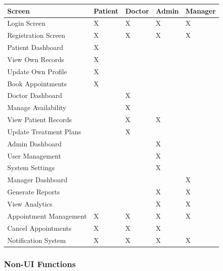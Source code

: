 \documentclass[12pt,a4paper]{article}
\begin{document}
\begin{longtable}{|p{4cm}|p{2cm}|p{2cm}|p{2cm}|p{2cm}|}
\hline
\textbf{Screen} & \textbf{Patient} & \textbf{Doctor} & \textbf{Admin} & \textbf{Manager} \\
\hline
Login Screen & X & X & X & X \\
\hline
Registration Screen & X & X & X & X \\
\hline
Patient Dashboard & X & & & \\
\hline
\quad View Own Records & X & & & \\
\hline
\quad Update Own Profile & X & & & \\
\hline
\quad Book Appointments & X & & & \\
\hline
Doctor Dashboard & & X & & \\
\hline
\quad Manage Availability & & X & & \\
\hline
\quad View Patient Records & & X & X & \\
\hline
\quad Update Treatment Plans & & X & & \\
\hline
Admin Dashboard & & & X & \\
\hline
\quad User Management & & & X & \\
\hline
\quad System Settings & & & X & \\
\hline
Manager Dashboard & & & & X \\
\hline
\quad Generate Reports & & & X & X \\
\hline
\quad View Analytics & & & X & X \\
\hline
Appointment Management & X & X & X & X \\
\hline
\quad Cancel Appointments & X & X & X & \\
\hline
Notification System & X & X & X & X \\
\hline
\end{longtable}

\subsubsection{Non-UI Functions}
\end{document}

